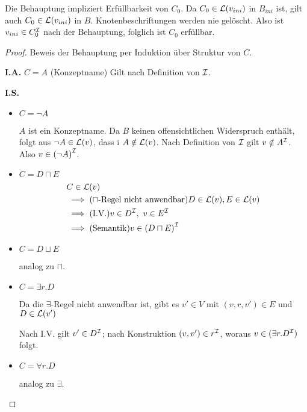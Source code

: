 \begin{tafel}
        Die Behauptung impliziert Erfüllbarkeit von $C_0$. Da $C_0 \in \mathcal{L}(v_{ini})$ in $B_{ini}$ ist, gilt auch $C_0 \in \mathcal{L}(v_{ini})$ in $B$. Knotenbeschriftungen werden nie gelöscht. Also ist $v_{ini} \in C_0^{\mathcal{I}}$ nach der Behauptung, folglich ist $C_0$ erfüllbar.
    \begin{proof}
        Beweis der Behauptung per Induktion über Struktur von $C$.
        
        \textbf{I.A.} $C = A$ (Konzeptname) Gilt nach Definition von
        $\mathcal{I}$.
        
        \textbf{I.S.}

\begin{itemize}
\item $C = \neg A$

$A$ ist ein Konzeptname. Da $B$ keinen offensichtlichen Widerspruch enthält,
folgt aus $\neg A \in \mathcal{L}(v)$, dass i $A \notin \mathcal{L}(v)$. Nach Definition von
$\mathcal{I}$ gilt $v \notin A^{\mathcal{I}}$. Also $v \in \left( \neg A \right)^\MI$.

\item $C = D \sqcap E$
    \begin{align*}
        &C \in \ML(v)\\
        &\implies (\sqcap\text{-Regel nicht anwendbar}) D \in \ML(v), E \in \ML(v)\\
        &\implies (\text{I.V.}) v \in D^\MI,\ v \in E^\MI\\
        &\implies (\text{Semantik}) v \in \left( D \sqcap E \right)^\MI
    \end{align*}

\item $C = D \sqcup E$

analog zu $\sqcap$.

\item $C = \exists r.D$

Da die $\exists$-Regel nicht anwendbar ist, gibt es $v'\in V$ mit $(v,r,v')
\in E$ und $D \in \mathcal{L}(v')$

Nach I.V. gilt $v' \in D^{\mathcal{I}}$; nach Konstruktion $(v,v') \in r^{\mathcal{I}}$, woraus
$v \in (\exists r.D^{\mathcal{I}})$ folgt.

\item $C = \forall r.D$

analog zu $\exists$.
\end{itemize}
    \end{proof}
\end{tafel}

